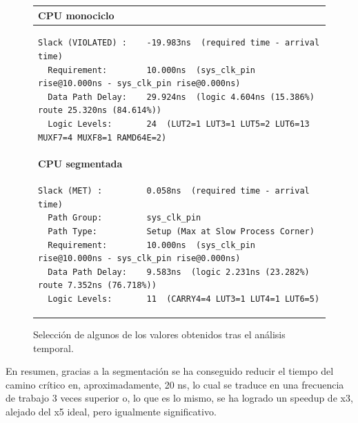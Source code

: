 \vspace{+0.1cm}
\begin{figure}[H]
\centering
\renewcommand{\arraystretch}{1}
\begin{tabular}{|p{}|}
\hline
\textbf{CPU monociclo} \\
\hline
\begin{lstlisting}[style=RiscVStyleSmaller]
Slack (VIOLATED) :    -19.983ns  (required time - arrival time)
  Requirement:        10.000ns  (sys_clk_pin rise@10.000ns - sys_clk_pin rise@0.000ns)
  Data Path Delay:    29.924ns  (logic 4.604ns (15.386%)  route 25.320ns (84.614%))
  Logic Levels:       24  (LUT2=1 LUT3=1 LUT5=2 LUT6=13 MUXF7=4 MUXF8=1 RAMD64E=2)
\end{lstlisting}
\\
\hline
\textbf{CPU segmentada} \\
\hline
\begin{lstlisting}[style=RiscVStyleSmaller]
Slack (MET) :         0.058ns  (required time - arrival time)
  Path Group:         sys_clk_pin
  Path Type:          Setup (Max at Slow Process Corner)
  Requirement:        10.000ns  (sys_clk_pin rise@10.000ns - sys_clk_pin rise@0.000ns)
  Data Path Delay:    9.583ns  (logic 2.231ns (23.282%)  route 7.352ns (76.718%))
  Logic Levels:       11  (CARRY4=4 LUT3=1 LUT4=1 LUT6=5)
\end{lstlisting}
\\
\hline
\end{tabular}
\caption{Selección de algunos de los valores obtenidos tras el análisis temporal.}
\end{figure}

En resumen, gracias a la segmentación se ha conseguido reducir el tiempo del camino crítico en, aproximadamente, 20 ns, lo cual se traduce en una frecuencia de trabajo 3 veces superior o, lo que es lo mismo, se ha logrado un speedup de x3, alejado del x5 ideal, pero igualmente significativo.